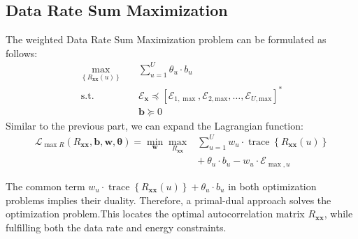 \subsection{Data Rate Sum Maximization} \label{Rsum}
The weighted Data Rate Sum Maximization problem can be formulated as follows:
\begin{equation}
\begin{aligned}
\max _{\left\{R_{\boldsymbol{x} \boldsymbol{x}}{(u)}\right\}} \quad &\sum_{u=1}^U \theta_u \cdot b_u \\
\textrm{s.t.} \quad &\mathcal{E}_{\boldsymbol{x}} \preceq\left[\mathcal{E}_{1,\max}, \mathcal{E}_{2,\text{max}},\ldots,\mathcal{E}_{U,\text{max}}\right]^*\\
& \mathbf{b} \succeq 0
\end{aligned}
\end{equation}
Similar to the previous part, we can expand the Lagrangian function:
\begin{equation}
\begin{aligned}
\mathcal{L}_{\max R}\left(R_{\boldsymbol{x} \boldsymbol{x}}, \boldsymbol{b}, \boldsymbol{w}, \boldsymbol{\theta}\right)=\min _{\boldsymbol{w}} \max _{R_{\boldsymbol{x} \boldsymbol{x}}} &\sum_{u=1}^U w_u \cdot \operatorname{trace}\left\{R_{\boldsymbol{x} \boldsymbol{x}}(u)\right\}\\ &+\:\theta_u \cdot b_u-w_u \cdot \mathcal{E}_{\max , u}
\end{aligned}
\end{equation} 

The common term $w_u \cdot \operatorname{trace}\left\{R_{\boldsymbol{x} \boldsymbol{x}}(u)\right\} + \theta_u \cdot b_u$ in both optimization problems implies their duality. Therefore, a primal-dual approach solves the optimization problem.This locates the optimal autocorrelation matrix $R_{\boldsymbol{xx}}$, while fulfilling both the data rate and energy constraints. 


